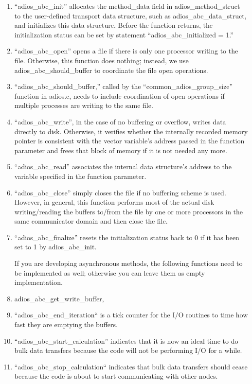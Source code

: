 \begin{enumerate}
\item ``adios\_abc\_init'' allocates the method\_data field in adios\_method\_struct 
to the user-defined transport data structure, such as adios\_abc\_data\_struct, 
and initializes this data structure. Before the function returns, the initialization 
status can be set by statement ``adios\_abc\_initialized = 1.''

\item ``adios\_abc\_open'' opens a file if there is only one processor writing to 
the file. Otherwise, this function does nothing; instead, we use adios\_abc\_should\_buffer 
to coordinate the file open operations.   

\item ``adios\_abc\_should\_buffer,'' called by the ``common\_adios\_group\_size'' 
function in adios.c, needs to include coordination of open operations if multiple 
processes are writing to the same file. 

\item ``adios\_abc\_write'', in the case of no buffering or overflow, writes data 
directly to disk. Otherwise, it verifies whether the internally recorded memory 
pointer is consistent with the vector variable's address passed in the function 
parameter and frees that block of memory if it is not needed any more.  

\item ``adios\_abc\_read'' associates the internal data structure's address to the 
variable specified in the function parameter.

\item ``adios\_abc\_close'' simply closes the file if no buffering scheme is used. 
However, in general, this function performs most of the actual disk writing/reading 
the buffers to/from the file by one or more processors in the same communicator 
domain and then close the file. 

\item ``adios\_abc\_finalize'' resets the initialization status back to 0 if it has 
been set to 1 by adios\_abc\_init. 

If you are developing asynchronous methods, the following functions need to be 
implemented as well; otherwise you can leave them as empty implementation.

\item adios\_abc\_get\_write\_buffer,

\item ``adios\_abc\_end\_iteration`` is a tick counter for the I/O 
routines to time how fast they are emptying the buffers. 

\item ``adios\_abc\_start\_calculation'' indicates that it is now 
an ideal time to do bulk data transfers because the code will not be performing 
I/O for a while.

\item ``adios\_abc\_stop\_calculation`` indicates that bulk data 
transfers should cease because the code is about to start communicating with other 
nodes.
\end{enumerate}

